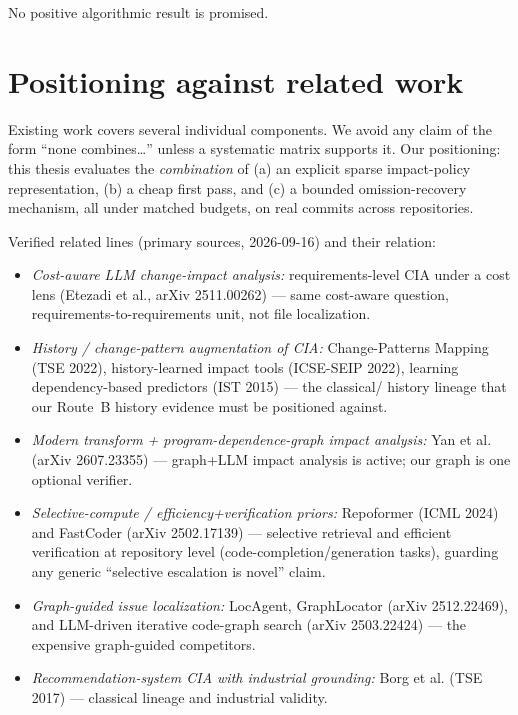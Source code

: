 \documentclass[11pt,a4paper]{article}
\begin{document}
No positive algorithmic result is promised.

\section{Positioning against related work}
\label{sec:related}

Existing work covers several individual components. We avoid any claim of the
form ``none combines\ldots'' unless a systematic matrix supports it. Our
positioning: this thesis evaluates the \emph{combination} of (a) an explicit
sparse impact-policy representation, (b) a cheap first pass, and (c) a
bounded omission-recovery mechanism, all under matched budgets, on real
commits across repositories.

Verified related lines (primary sources, 2026-09-16) and their relation:

\begin{itemize}
  \item \emph{Cost-aware LLM change-impact analysis:} requirements-level CIA
        under a cost lens (Etezadi et al., arXiv 2511.00262) --- same
        cost-aware question, requirements-to-requirements unit, not file
        localization.
  \item \emph{History / change-pattern augmentation of CIA:} Change-Patterns
        Mapping (TSE 2022), history-learned impact tools (ICSE-SEIP 2022),
        learning dependency-based predictors (IST 2015) --- the classical/
        history lineage that our Route~B history evidence must be positioned
        against.
  \item \emph{Modern transform + program-dependence-graph impact analysis:}
        Yan et al. (arXiv 2607.23355) --- graph+LLM impact analysis is active;
        our graph is one optional verifier.
  \item \emph{Selective-compute / efficiency+verification priors:} Repoformer
        (ICML 2024) and FastCoder (arXiv 2502.17139) --- selective retrieval and
        efficient verification at repository level (code-completion/generation
        tasks), guarding any generic ``selective escalation is novel'' claim.
  \item \emph{Graph-guided issue localization:} LocAgent, GraphLocator
        (arXiv 2512.22469), and LLM-driven iterative code-graph search
        (arXiv 2503.22424) --- the expensive graph-guided competitors.
  \item \emph{Recommendation-system CIA with industrial grounding:} Borg et al.
        (TSE 2017) --- classical lineage and industrial validity.
\end{itemize}
\end{document}
